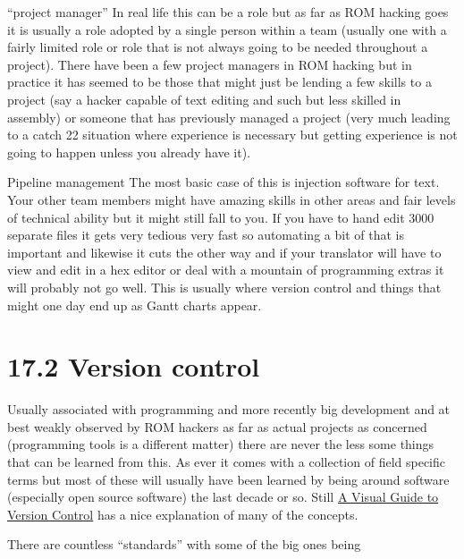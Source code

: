 \documentclass[
]{book}
\begin{document}
``project manager'' In real life this can be a role but as far as ROM hacking goes it is usually a role adopted by a single person within a team (usually one with a fairly limited role or role that is not always going to be needed throughout a project). There have been a few project managers in ROM hacking but in practice it has seemed to be those that might just be lending a few skills to a project (say a hacker capable of text editing and such but less skilled in assembly) or someone that has previously managed a project (very much leading to a catch 22 situation where experience is necessary but getting experience is not going to happen unless you already have it).

Pipeline management The most basic case of this is injection software for text. Your other team members might have amazing skills in other areas and fair levels of technical ability but it might still fall to you. If you have to hand edit 3000 separate files it gets very tedious very fast so automating a bit of that is important and likewise it cuts the other way and if your translator will have to view and edit in a hex editor or deal with a mountain of programming extras it will probably not go well. This is usually where version control and things that might one day end up as Gantt charts appear.

\hypertarget{version-control}{%
\section{17.2 Version control}\label{version-control}}

Usually associated with programming and more recently big development and at best weakly observed by ROM hackers as far as actual projects as concerned (programming tools is a different matter) there are never the less some things that can be learned from this. As ever it comes with a collection of field specific terms but most of these will usually have been learned by being around software (especially open source software) the last decade or so. Still \href{http://betterexplained.com/articles/a-visual-guide-to-version-control/}{A Visual Guide to Version Control} has a nice explanation of many of the concepts.

There are countless ``standards'' with some of the big ones being
\end{document}
